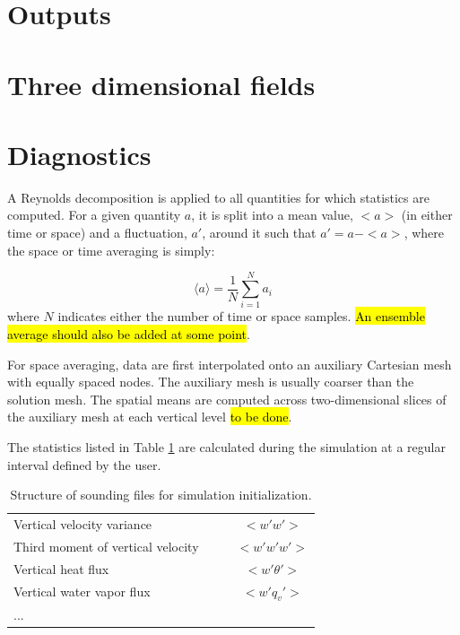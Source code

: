 \documentclass{report}
\begin{document}
\section{Outputs}
\section{Three dimensional fields}


\section{Diagnostics}

A Reynolds decomposition is applied to all quantities for which statistics are computed. For a given quantity $a$, it is split into a mean value, $<a>$  (in either time or space) and a fluctuation, $a'$, around it such that $a' = a - <a>$, where the space or time averaging is simply:

\begin{equation}
    \langle a \rangle = \frac{1}{N} \sum_{i=1}^N a_i
\end{equation}
where $N$ indicates either the number of time or space samples. \hl{An ensemble average should also be added at some point}.

For space averaging, data are first interpolated onto an auxiliary Cartesian mesh with equally spaced nodes. The auxiliary mesh is usually coarser than the solution mesh.
The spatial means are computed across two-dimensional slices of the auxiliary mesh at each vertical level  \hl{to be done}.

The statistics listed in Table \ref{tab:stats} are calculated during the simulation at a regular interval defined by the user. 

\begin{table}[t]
\centering
{\footnotesize
\caption[short]{Structure of sounding files for simulation initialization.}
\label{tab:stats}
\begin{tabular*}{\textwidth}{ @{\extracolsep{\fill}} lccc}
\hline
\hline
Vertical velocity variance & & &$<w' w'>$\\
Third moment of vertical velocity & & &$<w'w'w'>$\\
Vertical heat flux & & &$<w' \theta'>$\\
Vertical water vapor flux & & &$<w' q_v'>$\\
...\\
\hline
\hline
\end{tabular*}
}
\end{table}
\end{document}
